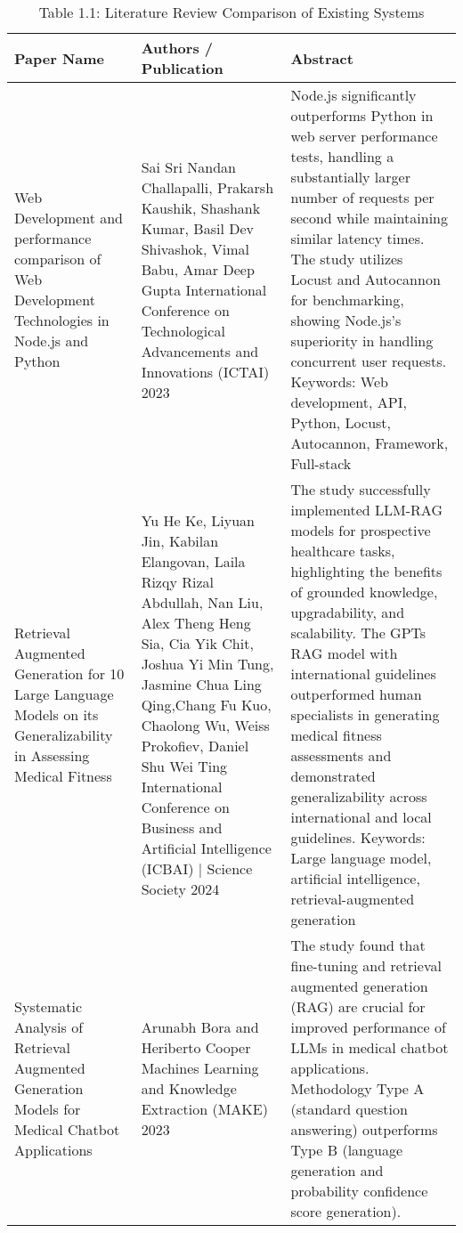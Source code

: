 \begin{table}[ht]
\centering
\caption{Table 1.1: Literature Review Comparison of Existing Systems}
\begin{tabularx}{\textwidth}{@{} >{\raggedright\arraybackslash}p{3.5cm} >{\raggedright\arraybackslash}p{4.5cm} >{\raggedright\arraybackslash}X @{}}
\toprule
\textbf{Paper Name} & \textbf{Authors / Publication} & \textbf{Abstract} \\
\midrule
Web Development and performance comparison of Web Development Technologies in Node.js and Python & Sai Sri Nandan Challapalli, Prakarsh Kaushik, Shashank Kumar, Basil Dev Shivashok, Vimal Babu, Amar Deep Gupta \newline International Conference on Technological Advancements and Innovations (ICTAI) 2023 & Node.js significantly outperforms Python in web server performance tests, handling a substantially larger number of requests per second while maintaining similar latency times. The study utilizes Locust and Autocannon for benchmarking, showing Node.js's superiority in handling concurrent user requests. Keywords: Web development, API, Python, Locust, Autocannon, Framework, Full-stack \\
\midrule
Retrieval Augmented Generation for 10 Large Language Models on its Generalizability in Assessing Medical Fitness & Yu He Ke, Liyuan Jin, Kabilan Elangovan, Laila Rizqy Rizal Abdullah, Nan Liu, Alex Theng Heng Sia, Cia Yik Chit, Joshua Yi Min Tung, Jasmine Chua Ling Qing,Chang Fu Kuo, Chaolong Wu, Weiss Prokofiev, Daniel Shu Wei Ting \newline International Conference on Business and Artificial Intelligence (ICBAI) | Science Society 2024 & The study successfully implemented LLM-RAG models for prospective healthcare tasks, highlighting the benefits of grounded knowledge, upgradability, and scalability. The GPTs RAG model with international guidelines outperformed human specialists in generating medical fitness assessments and demonstrated generalizability across international and local guidelines. Keywords: Large language model, artificial intelligence, retrieval-augmented generation \\
\midrule
Systematic Analysis of Retrieval Augmented Generation Models for Medical Chatbot Applications & Arunabh Bora and Heriberto Cooper \newline Machines Learning and Knowledge Extraction (MAKE) 2023 & The study found that fine-tuning and retrieval augmented generation (RAG) are crucial for improved performance of LLMs in medical chatbot applications. Methodology Type A (standard question answering) outperforms Type B (language generation and probability confidence score generation). \\

\end{tabularx}
\end{table}
